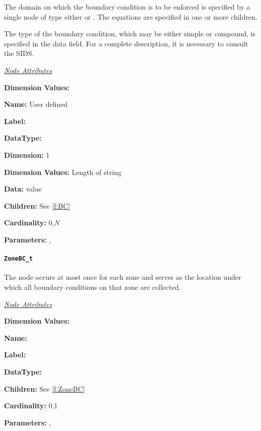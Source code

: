The domain on which the boundary condition is to be enforced is
specified by a single node of type either  or
. The equations are specified in one or
more  children.

The type of the boundary condition, which may be either simple or
compound, is specified in the data field.  For a complete description,
it is necessary to consult the SIDS.

\textit{\uline{Node Attributes}}
\begin{Ventryic}{\textbf{Dimension Values:}}
\item [\textbf{Name:}]
      User defined
\item [\textbf{Label:}]
\item [\textbf{DataType:}]
\item [\textbf{Dimension:}]
      1
\item [\textbf{Dimension Values:}]
      Length of string
\item [\textbf{Data:}]
       value
\item [\textbf{Children:}]
      See \autoref{f:BC}
\item [\textbf{Cardinality:}]
      0,$N$
\item [\textbf{Parameters:}]
      , 
\end{Ventryic}

\paragraph{\texttt{ZoneBC\_t}}

The  node occurs at most once for each zone and serves
as the location under which all boundary conditions on that zone are
collected.

\textit{\uline{Node Attributes}}
\begin{Ventryic}{\textbf{Dimension Values:}}
\item [\textbf{Name:}]
\item [\textbf{Label:}]
\item [\textbf{DataType:}]
\item [\textbf{Children:}]
      See \autoref{f:ZoneBC}
\item [\textbf{Cardinality:}]
      0,1
\item [\textbf{Parameters:}]
      , 
\end{Ventryic}

